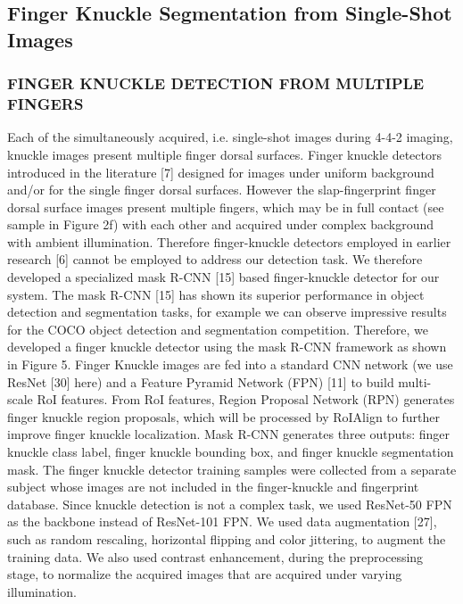 \subsection{Finger Knuckle Segmentation from Single-Shot Images}
\subsubsection{FINGER KNUCKLE DETECTION FROM MULTIPLE FINGERS}
Each of the simultaneously acquired, i.e. single-shot images during 4-4-2 imaging, knuckle images present multiple finger dorsal surfaces. Finger knuckle detectors introduced in the literature [7] designed for images under uniform background and/or for the single finger dorsal surfaces. However the slap-fingerprint finger dorsal surface images present multiple fingers, which may be in full contact (see sample in Figure 2f) with each other and acquired under complex background with ambient illumination. Therefore finger-knuckle detectors employed in earlier research [6] cannot be employed to address our detection task. We therefore developed a specialized mask R-CNN [15] based finger-knuckle detector for our system. The mask R-CNN [15] has shown its superior performance in object detection and segmentation tasks, for example we can observe impressive results for the COCO object detection and segmentation competition. Therefore, we developed a finger knuckle detector using the mask R-CNN framework as shown in Figure 5. Finger Knuckle images are fed into a standard CNN network (we use ResNet [30] here) and a Feature Pyramid Network (FPN) [11] to build multi-scale RoI features. From RoI features, Region Proposal Network (RPN) generates finger knuckle region proposals, which will be processed by RoIAlign to further improve finger knuckle localization. Mask R-CNN generates three outputs: finger knuckle class label, finger knuckle bounding box, and finger knuckle segmentation mask. The finger knuckle detector training samples were collected from a separate subject whose images are not included in the finger-knuckle and fingerprint database. Since knuckle detection is not a complex task, we used ResNet-50 FPN as the backbone instead of ResNet-101 FPN. We used data augmentation [27], such as random rescaling, horizontal flipping and color jittering, to augment the training data. We also used contrast enhancement, during the preprocessing stage, to normalize the acquired images that are acquired under varying illumination. 

